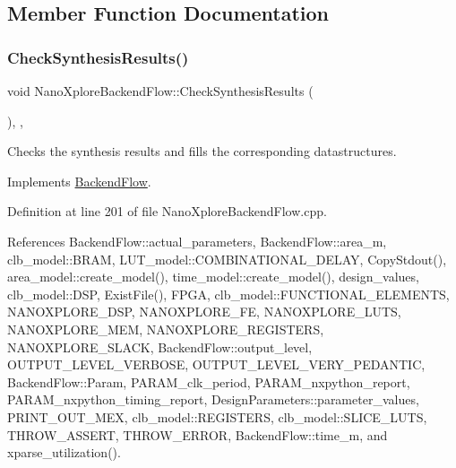 \subsection{Member Function Documentation}
\mbox{\label{classNanoXploreBackendFlow_ab62a47ac25b6bb973d3612feee8c14b3}} 
\subsubsection{\texorpdfstring{Check\+Synthesis\+Results()}{CheckSynthesisResults()}}
{\footnotesize\ttfamily void Nano\+Xplore\+Backend\+Flow\+::\+Check\+Synthesis\+Results (\begin{DoxyParamCaption}{ }\end{DoxyParamCaption})\hspace{0.3cm}{\ttfamily [override]}, {\ttfamily [protected]}, {\ttfamily [virtual]}}



Checks the synthesis results and fills the corresponding datastructures. 



Implements \hyperlink{classBackendFlow_ad2096d43b7c9c47611d719188215f23f}{Backend\+Flow}.



Definition at line 201 of file Nano\+Xplore\+Backend\+Flow.\+cpp.



References Backend\+Flow\+::actual\+\_\+parameters, Backend\+Flow\+::area\+\_\+m, clb\+\_\+model\+::\+B\+R\+AM, L\+U\+T\+\_\+model\+::\+C\+O\+M\+B\+I\+N\+A\+T\+I\+O\+N\+A\+L\+\_\+\+D\+E\+L\+AY, Copy\+Stdout(), area\+\_\+model\+::create\+\_\+model(), time\+\_\+model\+::create\+\_\+model(), design\+\_\+values, clb\+\_\+model\+::\+D\+SP, Exist\+File(), F\+P\+GA, clb\+\_\+model\+::\+F\+U\+N\+C\+T\+I\+O\+N\+A\+L\+\_\+\+E\+L\+E\+M\+E\+N\+TS, N\+A\+N\+O\+X\+P\+L\+O\+R\+E\+\_\+\+D\+SP, N\+A\+N\+O\+X\+P\+L\+O\+R\+E\+\_\+\+FE, N\+A\+N\+O\+X\+P\+L\+O\+R\+E\+\_\+\+L\+U\+TS, N\+A\+N\+O\+X\+P\+L\+O\+R\+E\+\_\+\+M\+EM, N\+A\+N\+O\+X\+P\+L\+O\+R\+E\+\_\+\+R\+E\+G\+I\+S\+T\+E\+RS, N\+A\+N\+O\+X\+P\+L\+O\+R\+E\+\_\+\+S\+L\+A\+CK, Backend\+Flow\+::output\+\_\+level, O\+U\+T\+P\+U\+T\+\_\+\+L\+E\+V\+E\+L\+\_\+\+V\+E\+R\+B\+O\+SE, O\+U\+T\+P\+U\+T\+\_\+\+L\+E\+V\+E\+L\+\_\+\+V\+E\+R\+Y\+\_\+\+P\+E\+D\+A\+N\+T\+IC, Backend\+Flow\+::\+Param, P\+A\+R\+A\+M\+\_\+clk\+\_\+period, P\+A\+R\+A\+M\+\_\+nxpython\+\_\+report, P\+A\+R\+A\+M\+\_\+nxpython\+\_\+timing\+\_\+report, Design\+Parameters\+::parameter\+\_\+values, P\+R\+I\+N\+T\+\_\+\+O\+U\+T\+\_\+\+M\+EX, clb\+\_\+model\+::\+R\+E\+G\+I\+S\+T\+E\+RS, clb\+\_\+model\+::\+S\+L\+I\+C\+E\+\_\+\+L\+U\+TS, T\+H\+R\+O\+W\+\_\+\+A\+S\+S\+E\+RT, T\+H\+R\+O\+W\+\_\+\+E\+R\+R\+OR, Backend\+Flow\+::time\+\_\+m, and xparse\+\_\+utilization().

